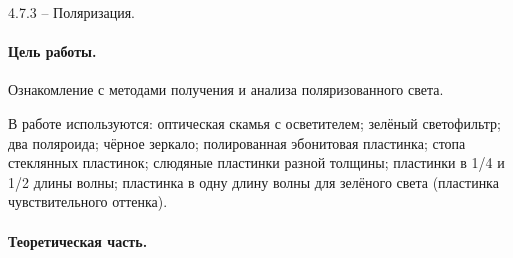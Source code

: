 \documentclass{../lab_class}
\begin{document}
{\Large 4.7.3 -- Поляризация.}

\paragraph{Цель работы.}
Ознакомление с методами получения и анализа поляризованного света.

В работе используются: оптическая скамья с осветителем; зелёный светофильтр; два поляроида; чёрное зеркало; полированная эбонитовая пластинка; стопа стеклянных пластинок; слюдяные пластинки разной толщины; пластинки в 1/4 и 1/2 длины волны; пластинка в одну длину волны для зелёного света (пластинка чувствительного оттенка).

\paragraph{Теоретическая часть.}
\end{document}
